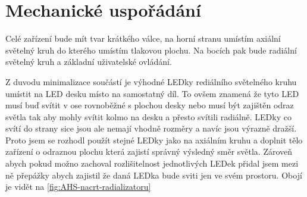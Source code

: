 \newpage

\section{Mechanické uspořádání}

Celé zařízení bude mít tvar krátkého válce, na horní stranu umístím axiální světelný kruh do kterého umístím tlakovou plochu.
Na bocích pak bude radiální světelný kruh a základní uživatelské ovládání.

Z duvodu minimalizace součástí je výhodné LEDky rediálního světelného kruhu umístit na LED desku místo na samostatný díl.
To ovšem znamená že tyto LED musí buď svítit v ose rovnoběžné s plochou desky nebo musí být zajištěn odraz světla tak aby mohly svítit kolmo na desku a přesto svítili radiálně.
LEDky co svítí do strany sice jsou ale nemají vhodně rozměry a navíc jsou výrazně dražší.
Proto jsem se rozhodl použít stejné LEDky jako na axiálním kruhu a doplnit tělo zařízení o odraznou plochu která zajistí správný výsledný směr světla.
Zároveň abych pokud možno zachoval rozlišitelnost jednotlivých LEDek přidal jsem mezi ně přepážky abych zajistil že daná LEDka bude sviti jen ve svém prostoru.
Obojí je vidět na \ref{fig:AHS-nacrt-radializatoru}

